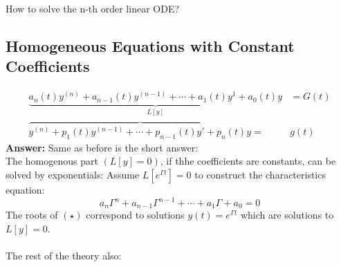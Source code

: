 How to solve the n-th order linear ODE?
\subsection*{Homogeneous Equations with Constant Coefficients}
\begin{align*}
	\underbrace{a_n(t) y^{(n)} + a_{n-1}(t) y^{(n-1)} + \cdots + a_1(t) y^1 + a_0(t)y}_{L[y]} & = G(t)\\
	\overbrace{y^{(n)} + p_1(t) y^{(n-1)} + \cdots + p_{n-1}(t)y' + p_n(t)y} = & g(t)
\end{align*}
\textbf{Answer:} Same as before is the short answer:\\
The homogenous part $(L[y] = 0)$, if thhe coefficients are constants, can be solved by exponentials: Assume $L[e^{\Gamma t}] = 0$ to construct the characteristics equation:
\begin{equation*}
	a_n \Gamma^n + a_{n-1} \Gamma^{n-1} + \cdots + a_1\Gamma + a_0 = 0 \tag{$\star$}
\end{equation*}
The roots of $(\star)$ correspond to solutions $y(t) = e^{\Gamma t}$ which are solutions to $L[y] = 0$.\\\\
The rest of the theory also:
